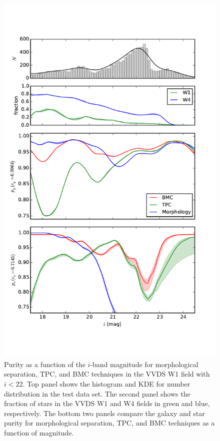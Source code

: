 \documentclass[useAMS,usenatbib]{mn2e}
\begin{document}
\begin{figure}
  \centering
  \includegraphics[width=\linewidth]{figures/purity_mag_cut.pdf}
  \caption{Purity as a function of the $i$-band magnitude
           for morphological separation, TPC, and BMC techniques
           in the VVDS W1 field with $i < 22$.
           Top panel shows the histogram and KDE for number distribution
           in the test data set.
           The second panel shows the fraction of stars
           in the VVDS W1 and W4 fields in green and blue, respectively.
           The bottom two panels compare
           the galaxy and star purity for morphological separation, TPC,
           and BMC techniques as a function of magnitude.}
  \label{fig:purity_mag_cut}
\end{figure}
\end{document}
